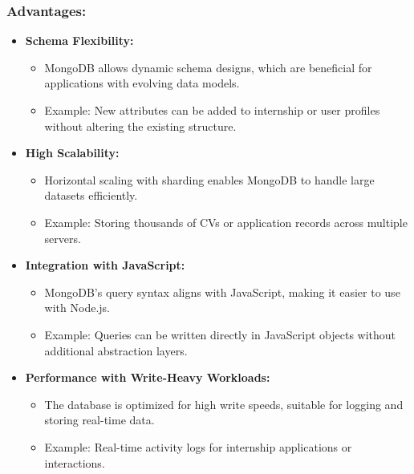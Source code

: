 \subsubsection*{Advantages:}
\begin{itemize}
    \item \textbf{Schema Flexibility:}
    \begin{itemize}
        \item MongoDB allows dynamic schema designs, which are beneficial for applications with evolving data models.
        \item Example: New attributes can be added to internship or user profiles without altering the existing structure.
    \end{itemize}
    \item \textbf{High Scalability:}
    \begin{itemize}
        \item Horizontal scaling with sharding enables MongoDB to handle large datasets efficiently.
        \item Example: Storing thousands of CVs or application records across multiple servers.
    \end{itemize}
    \item \textbf{Integration with JavaScript:}
    \begin{itemize}
        \item MongoDB’s query syntax aligns with JavaScript, making it easier to use with Node.js.
        \item Example: Queries can be written directly in JavaScript objects without additional abstraction layers.
    \end{itemize}
    \item \textbf{Performance with Write-Heavy Workloads:}
    \begin{itemize}
        \item The database is optimized for high write speeds, suitable for logging and storing real-time data.
        \item Example: Real-time activity logs for internship applications or interactions.
    \end{itemize}
\end{itemize}

